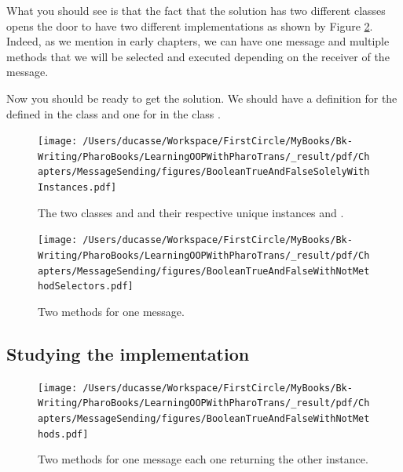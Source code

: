 \documentclass[10pt,twoside,english]{_support/latex/sbabook/sbabook}
\begin{document}
What you should see is that the fact that the solution has two different classes opens the door to have two different  implementations as shown by Figure \ref{figTrueFalseOnlySelectors}. Indeed, as we mention in early chapters, we can have one message and multiple methods that we will be selected and executed depending on the receiver of the message. 

Now you should be ready to get the solution. We should have a definition for the  defined in the class  and one for  in the class .


\begin{figure}

\begin{center}
\texttt{[image: /Users/ducasse/Workspace/FirstCircle/MyBooks/Bk-Writing/PharoBooks/LearningOOPWithPharoTrans/\_result/pdf/Chapters/MessageSending/figures/BooleanTrueAndFalseSolelyWithInstances.pdf]}\caption{The two classes  and  and their respective unique instances  and .\label{figTrueFalseOnly}}\end{center}
\end{figure}



\begin{figure}

\begin{center}
\texttt{[image: /Users/ducasse/Workspace/FirstCircle/MyBooks/Bk-Writing/PharoBooks/LearningOOPWithPharoTrans/\_result/pdf/Chapters/MessageSending/figures/BooleanTrueAndFalseWithNotMethodSelectors.pdf]}\caption{Two methods for one message.\label{figTrueFalseOnlySelectors}}\end{center}
\end{figure}

\subsection{Studying the implementation}

\begin{figure}

\begin{center}
\texttt{[image: /Users/ducasse/Workspace/FirstCircle/MyBooks/Bk-Writing/PharoBooks/LearningOOPWithPharoTrans/\_result/pdf/Chapters/MessageSending/figures/BooleanTrueAndFalseWithNotMethods.pdf]}\caption{Two methods for one message each one returning the other instance.\label{figTrueFalseSolution}}\end{center}
\end{figure}
\end{document}
